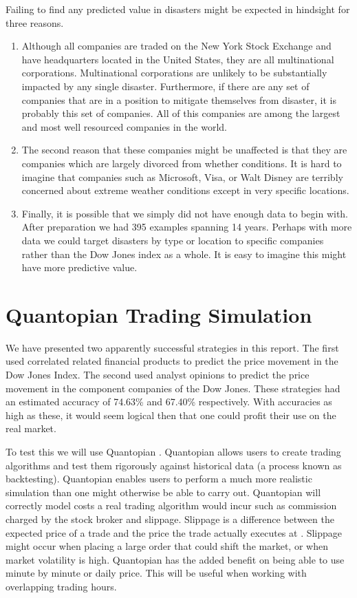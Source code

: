 \documentclass{report}
\begin{document}
Failing to find any predicted value in disasters might be expected in hindsight for three reasons.

\begin{enumerate}
  \item Although all companies are traded on the New York Stock Exchange and have headquarters located in the United States, they are all multinational corporations. Multinational corporations are unlikely to be substantially impacted by any single disaster. Furthermore, if there are any set of companies that are in a position to mitigate themselves from disaster, it is probably this set of companies. All of this companies are among the largest and most well resourced companies in the world.
  
  \item The second reason that these companies might be unaffected is that they are companies which are largely divorced from whether conditions. It is hard to imagine that companies such as Microsoft, Visa, or Walt Disney are terribly concerned about extreme weather conditions except in very specific locations.
  
  \item Finally, it is possible that we simply did not have enough data to begin with. After preparation we had 395 examples spanning 14 years. Perhaps with more data we could target disasters by type or location to specific companies rather than the Dow Jones index as a whole. It is easy to imagine this might have more predictive value.
  
\end{enumerate}

\chapter{Quantopian Trading Simulation}

We have presented two apparently successful strategies in this report. The first used correlated related financial products to predict the price movement in the Dow Jones Index. The second used analyst opinions to predict the price movement in the component companies of the Dow Jones. These strategies had an estimated accuracy of 74.63\% and 67.40\% respectively. With accuracies as high as these, it would seem logical then that one could profit their use on the real market.

To test this we will use Quantopian \cite{quantopian}. Quantopian allows users to create trading algorithms and test them rigorously against historical data (a process known as backtesting). Quantopian enables users to perform a much more realistic simulation than one might otherwise be able to carry out. Quantopian will correctly model costs a real trading algorithm would incur such as commission charged by the stock broker and slippage. Slippage is a difference between the expected price of a trade and the price the trade actually executes at \cite{slippage}. Slippage might occur when placing a large order that could shift the market, or when market volatility is high. Quantopian has the added benefit on being able to use minute by minute or daily price. This will be useful when working with overlapping trading hours.
\end{document}
